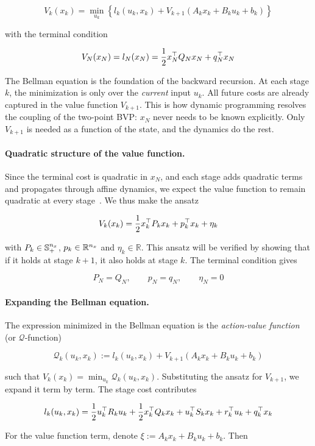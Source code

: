\[
V_k(x_k) = \min_{u_k} \left\lbrace l_k(u_k, x_k) + V_{k+1}(A_k x_k + B_k u_k + b_k) \right\rbrace
\]

with the terminal condition

\[
V_N(x_N) = l_N(x_N) = \frac{1}{2} x_N^\top Q_N x_N + q_N^\top x_N
\]

The Bellman equation is the foundation of the backward recursion.
At each stage $k$, the minimization is only over the \textit{current} input $u_k$.
All future costs are already captured in the value function $V_{k+1}$.
This is how dynamic programming resolves the coupling of the two-point BVP:
$x_N$ never needs to be known explicitly.
Only $V_{k+1}$ is needed as a function of the state, and the dynamics do the rest.

\paragraph{Quadratic structure of the value function.}
Since the terminal cost is quadratic in $x_N$, and each stage adds quadratic terms and propagates through affine dynamics, we expect the value function to remain quadratic at every stage~\cite{bertsekas1995dynamic}.
We thus make the ansatz

\[
V_k(x_k) = \frac{1}{2} x_k^\top P_k x_k + p_k^\top x_k + \eta_k
\]

with $P_k \in \mathbb{S}_{+}^{n_x}$, $p_k \in \mathbb{R}^{n_x}$ and $\eta_k \in \mathbb{R}$.
This ansatz will be verified by showing that if it holds at stage $k+1$, it also holds at stage $k$.
The terminal condition gives

\[
P_N = Q_N, \qquad p_N = q_N, \qquad \eta_N = 0
\]

\paragraph{Expanding the Bellman equation.}
The expression minimized in the Bellman equation is the \textit{action-value function} (or $\mathcal{Q}$-function)~\cite{watkins1992q}

\[
\mathcal{Q}_k(u_k, x_k) := l_k(u_k, x_k) + V_{k+1}(A_k x_k + B_k u_k + b_k)
\]

such that $V_k(x_k) = \min_{u_k} \mathcal{Q}_k(u_k, x_k)$.
Substituting the ansatz for $V_{k+1}$, we expand it term by term.
The stage cost contributes

\[
l_k(u_k, x_k) = \frac{1}{2} u_k^\top R_k u_k + \frac{1}{2} x_k^\top Q_k x_k + u_k^\top S_k x_k + r_k^\top u_k + q_k^\top x_k
\]

For the value function term, denote $\xi := A_k x_k + B_k u_k + b_k$.
Then

